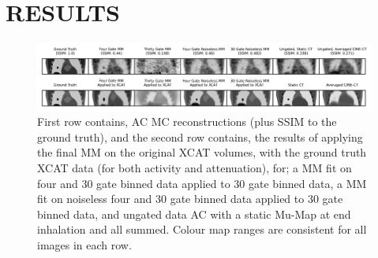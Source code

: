 \section{RESULTS} \label{sec:results}
    \begin{figure}
        
        \centering
        
        \includegraphics[width=1.0\linewidth]{figures/visual_analysis.png}
        
        
        \captionsetup{singlelinecheck=false, justification=centering}
        \caption{
        First row contains, \gls{AC} \gls{MC} reconstructions (plus \acrshort{SSIM} to the ground truth), and the second row contains, the results of applying the final \gls{MM} on the original \acrshort{XCAT} volumes, with the ground truth \acrshort{XCAT} data (for both activity and attenuation), for; a \gls{MM} fit on four and $30$ gate binned data applied to $30$ gate binned data, a \gls{MM} fit on noiseless four and $30$ gate binned data applied to $30$ gate binned data, and ungated data \gls{AC} with a static \gls{Mu-Map} at end inhalation and all  summed. Colour map ranges are consistent for all images in each row.}
        
        \label{fig:visual_analysis}
        
    \end{figure}
    
